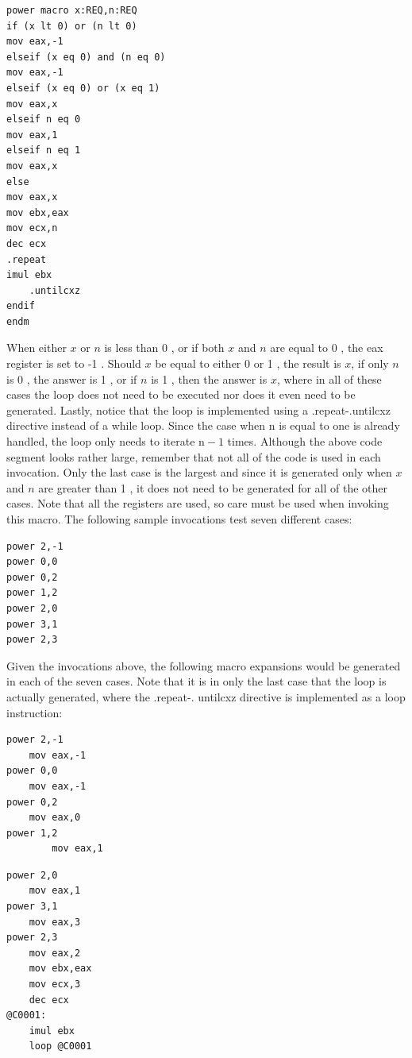 \documentclass[10pt]{book}
\begin{document}
\begin{verbatim}
power macro x:REQ,n:REQ
if (x lt 0) or (n lt 0)
mov eax,-1
elseif (x eq 0) and (n eq 0)
mov eax,-1
elseif (x eq 0) or (x eq 1)
mov eax,x
elseif n eq 0
mov eax,1
elseif n eq 1
mov eax,x
else
mov eax,x
mov ebx,eax
mov ecx,n
dec ecx
.repeat
imul ebx
    .untilcxz
endif
endm
\end{verbatim}

When either $x$ or $n$ is less than 0 , or if both $x$ and $n$ are equal to 0 , the eax register is set to -1 . Should $x$ be equal to either 0 or 1 , the result is $x$, if only $n$ is 0 , the answer is 1 , or if $n$ is 1 , then the answer is $x$, where in all of these cases the loop does not need to be executed nor does it even need to be generated. Lastly, notice that the loop is implemented using a .repeat-.untilcxz directive instead of a while loop. Since the case when n is equal to one is already handled, the loop only needs to
iterate $\mathrm{n}-1$ times. Although the above code segment looks rather large, remember that not all of the code is used in each invocation. Only the last case is the largest and since it is generated only when $x$ and $n$ are greater than 1 , it does not need to be generated for all of the other cases. Note that all the registers are used, so care must be used when invoking this macro. The following sample invocations test seven different cases:
\begin{verbatim}
power 2,-1
power 0,0
power 0,2
power 1,2
power 2,0
power 3,1
power 2,3
\end{verbatim}

Given the invocations above, the following macro expansions would be generated in each of the seven cases. Note that it is in only the last case that the loop is actually generated, where the .repeat-. untilcxz directive is implemented as a loop instruction:

\begin{verbatim}
power 2,-1
    mov eax,-1
power 0,0
    mov eax,-1
power 0,2
    mov eax,0
power 1,2
        mov eax,1
\end{verbatim}

\begin{verbatim}
power 2,0
    mov eax,1
power 3,1
    mov eax,3
power 2,3
    mov eax,2
    mov ebx,eax
    mov ecx,3
    dec ecx
@C0001:
    imul ebx
    loop @C0001
\end{verbatim}
\end{document}
